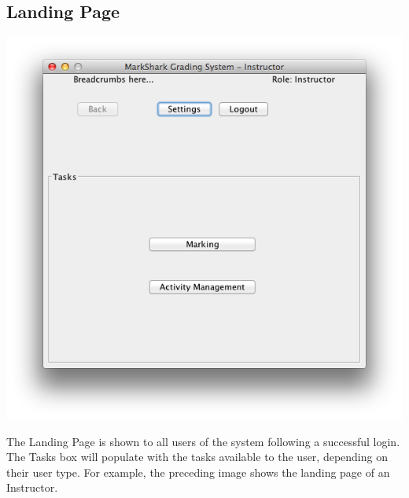 \documentclass{article}
\begin{document}
\subsection{Landing Page}
\centerline{\includegraphics[scale=0.65]{../images/UpdatedUIScreens/landinginstructor.png}}
\label{landPg}
The Landing Page is shown to all users of the system following a successful login. The Tasks box will populate with the tasks available to the user, depending on their user type. For example, the preceding image shows the landing page of an Instructor.\\
\clearpage
\end{document}
